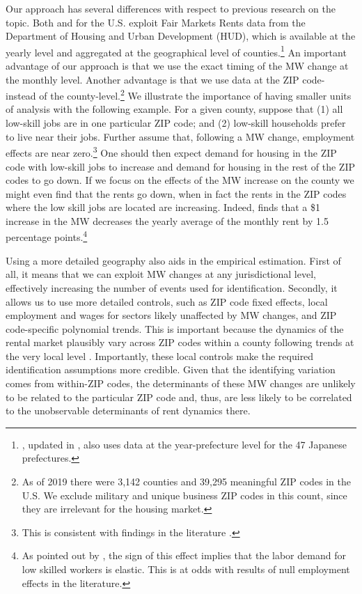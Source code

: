 Our approach has several differences with respect to previous research on the topic.
Both \textcite{Tidemann2018} and \textcite{Yamagishi2019} for the U.S. exploit Fair 
Markets Rents data from the Department of Housing and Urban Development (HUD), which is 
available at the yearly level and aggregated at the geographical level of 
counties.\footnote{\textcite{Yamagishi2019}, updated in \textcite{Yamagishi2021}, also 
	uses data at the year-prefecture level for the 47 Japanese prefectures.}
An important advantage of our approach is that we use the exact timing of the MW change 
at the monthly level.
Another advantage is that we use data at the ZIP code- instead of the 
county-level.\footnote{As of 2019 there were 3,142 counties and 39,295 meaningful ZIP 
	codes in the U.S. We exclude military and unique business ZIP codes in this count, 
	since they are irrelevant for the housing market.} 
We illustrate the importance of having smaller units of analysis with the following 
example.
For a given county, suppose that (1) all low-skill jobs are in one particular ZIP code; 
and (2) low-skill households prefer to live near their jobs. Further assume that, 
following a MW change, employment effects are near zero.\footnote{This is consistent with 
findings in the literature \parencite[for a comprehensive review see][]{Dube2019}.} 
One should then expect demand for housing in the ZIP code with low-skill jobs to increase 
and demand for housing in the rest of the ZIP codes to go down.
If we focus on the effects of the MW increase on the county we might even find that the 
rents go down, when in fact the rents in the ZIP codes where the low skill jobs are 
located are increasing.
Indeed, \textcite{Tidemann2018} finds that a \$1 increase in the MW decreases the yearly 
average of the monthly rent by 1.5 percentage points.\footnote{As pointed out by 
	\textcite{Tidemann2018}, the sign of this effect implies that the labor demand for 
	low skilled workers is elastic. This is at odds with results of null employment 
	effects in the literature.} 

Using a more detailed geography also aids in the empirical estimation.
First of all, it means that we can exploit MW changes at any jurisdictional level, 
effectively increasing the number of events used for identification.
Secondly, it allows us to use more detailed controls, such as ZIP code fixed effects, 
local employment and wages for sectors likely unaffected by MW changes, and ZIP 
code-specific polynomial trends.
This is important because the dynamics of the rental market plausibly vary across ZIP 
codes within a county following trends at the very local level 
\parencite{AlmagroDominguez2019}.
Importantly, these local controls make the required identification assumptions more credible. 
Given that the identifying variation comes from within-ZIP codes, the determinants of 
these MW changes are unlikely to be related to the particular ZIP code and, thus, are 
less likely to be correlated to the unobservable determinants of rent dynamics there.

